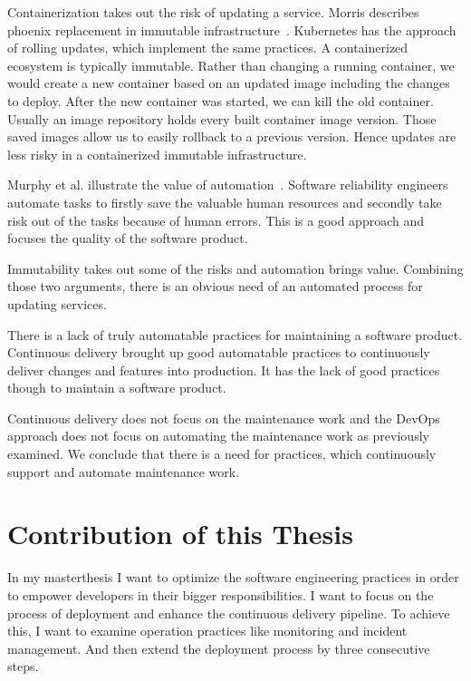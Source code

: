 Containerization takes out the risk of updating a service. Morris describes phoenix
replacement in immutable infrastructure~\cite{infra_as_code_phoenix}. Kubernetes has the
approach of rolling updates, which implement the same practices. A containerized ecosystem
is typically immutable. Rather than changing a running container, we would create a new
container based on an updated image including the changes to deploy. After the new
container was started, we can kill the old container. Usually an image repository holds
every built container image version. Those saved images allow us to easily rollback to a
previous version. Hence updates are less risky in a containerized immutable
infrastructure.

Murphy et al. illustrate the value of automation~\cite{sre_automation}. Software
reliability engineers automate tasks to firstly save the valuable human resources and
secondly take risk out of the tasks because of human errors. This is a good approach and
focuses the quality of the software product.

Immutability takes out some of the risks and automation brings value. Combining those two
arguments, there is an obvious need of an automated process for updating services.

There is a lack of truly automatable practices for maintaining a software
product. Continuous delivery brought up good automatable practices to continuously deliver
changes and features into production. It has the lack of good practices though to maintain
a software product.

Continuous delivery does not focus on the maintenance work and the DevOps approach does
not focus on automating the maintenance work as previously examined. We conclude that
there is a need for practices, which continuously support and automate maintenance work.

\section{Contribution of this Thesis}

In my masterthesis I want to optimize the software engineering practices in order to
empower developers in their bigger responsibilities. I want to focus on the process of
deployment and enhance the continuous delivery pipeline. To achieve this, I want to
examine operation practices like monitoring and incident management. And then extend the
deployment process by three consecutive steps.

